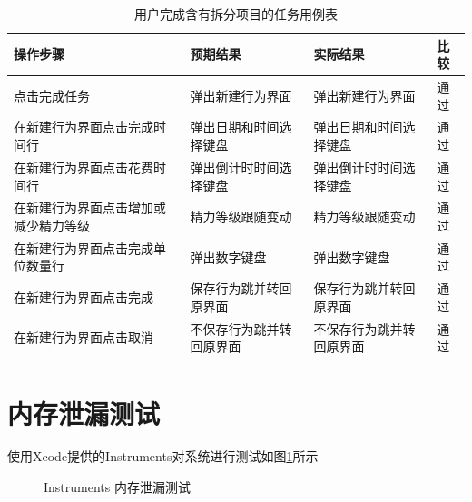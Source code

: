 \begin{table}[!h]
	\centering
	\caption{用户完成含有拆分项目的任务用例表}
	\begin{tabular}{p{3cm}p{3cm}p{3cm}p{3cm}} \toprule
	  操作步骤 & 预期结果 & 实际结果 & 比较 \\
	  \midrule
	  点击完成任务 & 弹出新建行为界面 & 弹出新建行为界面 & 通过 \\ \midrule
	  在新建行为界面点击完成时间行 & 弹出日期和时间选择键盘 & 弹出日期和时间选择键盘 & 通过 \\ \midrule
	  在新建行为界面点击花费时间行 & 弹出倒计时时间选择键盘 & 弹出倒计时时间选择键盘 & 通过 \\ \midrule
	  在新建行为界面点击增加或减少精力等级 & 精力等级跟随变动 & 精力等级跟随变动 & 通过 \\ \midrule
	  在新建行为界面点击完成单位数量行 & 弹出数字键盘 & 弹出数字键盘 & 通过 \\ \midrule
	  在新建行为界面点击完成 & 保存行为跳并转回原界面 & 保存行为跳并转回原界面 & 通过 \\ \midrule
	  在新建行为界面点击取消 & 不保存行为跳并转回原界面 & 不保存行为跳并转回原界面 & 通过 \\ \midrule
	  \bottomrule
	\end{tabular}
\end{table}

\section{内存泄漏测试}
使用Xcode提供的Instruments对系统进行测试如图\ref{fig:memory_test}所示
\begin{figure}[!h]
	\centering
	\caption{Instruments 内存泄漏测试}
	\label{fig:memory_test}
\end{figure}